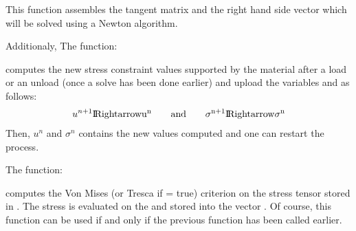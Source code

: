 \documentclass[a4paper,11pt,english]{sphinxmanual}
\begin{document}
This function assembles the tangent matrix and the right hand side vector which will be solved using a Newton algorithm.

Additionaly, The function:

\begin{sphinxVerbatim}[commandchars=\\\{\}]
            
\end{sphinxVerbatim}

computes the new stress constraint values supported by the material after a load or an unload (once a solve has been done earlier) and upload the variables  and  as follows:
\begin{equation*}
\begin{split}u^{n+1} \rm I\hspace{-0.15em}Rightarrow u^n \ \ \ \ \ \textrm{ and } \ \ \ \ \ \sigma^{n+1} \rm I\hspace{-0.15em}Rightarrow \sigma^n\end{split}
\end{equation*}
Then, \(u^n\) and \(\sigma^n\) contains the new values computed and one can restart the process.

The function:

\begin{sphinxVerbatim}[commandchars=\\\{\}]
        
\end{sphinxVerbatim}

computes the Von Mises (or Tresca if  = true) criterion on the stress tensor stored in  . The stress is evaluated on the   and stored into the vector .
Of course, this function can be used if and only if the previous function  has been called earlier.
\end{document}
